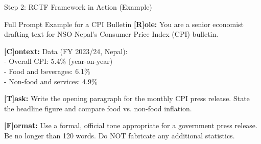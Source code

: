 \documentclass[aspectratio=169]{beamer}
\begin{document}
\begin{frame}{Step 2: RCTF Framework in Action (Example)}
    \begin{exampleblock}{Full Prompt Example for a CPI Bulletin}
        \textbf{[R]ole:} You are a senior economist drafting text for NSO Nepal's Consumer Price Index (CPI) bulletin. \\
        
        \vspace{0.2cm}
        
        \textbf{[C]ontext:} Data (FY 2023/24, Nepal): \\
        - Overall CPI: 5.4\% (year-on-year) \\
        - Food and beverages: 6.1\% \\
        - Non-food and services: 4.9\% \\
        
        \vspace{0.2cm}
        
        \textbf{[T]ask:} Write the opening paragraph for the monthly CPI press release. State the headline figure and compare food vs. non-food inflation. \\
        
        \vspace{0.2cm}
        
        \textbf{[F]ormat:} Use a formal, official tone appropriate for a government press release. Be no longer than 120 words. Do NOT fabricate any additional statistics.
    \end{exampleblock}
\end{frame}
\end{document}
